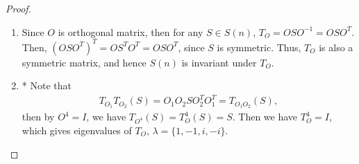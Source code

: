 \documentclass[10pt]{book}
\theoremstyle{definition}
\numberwithin{equation}{chapter}
\begin{document}
\begin{proof}
~\begin{enumerate}[label=(\alph*)]
    \item Since $O$ is orthogonal matrix, then for any $S \in S(n)$, $T_O = OSO^{-1} = OSO^T$. Then, $\left(OSO^T\right)^T = OS^TO^T = OSO^T$, since $S$ is symmetric. Thus, $T_O$ is also a symmetric matrix, and hence $S(n)$ is invariant under $T_O$.
    
    \item* Note that 
    \begin{align*}
        T_{O_1}T_{O_2}(S) = O_1 O_2 S O_2^T O_1^T = T_{O_1 O_2}(S),
    \end{align*}
    then by $O^4 = I$, we have $T_{O^4}(S) = T_{O}^4(S) = S$. Then we have $T_{O}^4 = I$, which gives eigenvalues of $T_O$, $\lambda = \{1, -1, i, -i\}$.
    

\end{enumerate}
\end{proof}
\end{document}
